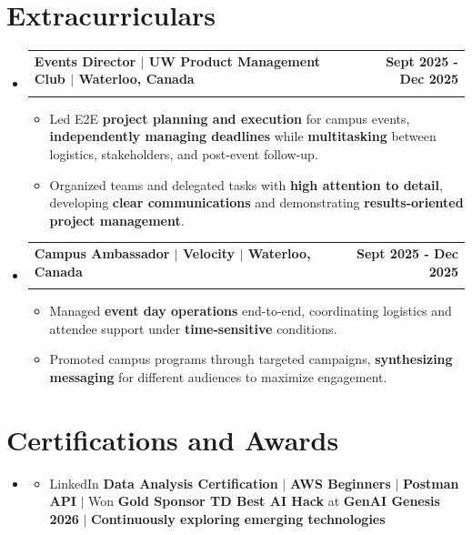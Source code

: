 \documentclass[letterpaper,10pt]{article}
\makeatletter
\newcommand{\resumeItem}[1]{
  \item\small{
    {#1 \vspace{-1pt}}
  }
}
\newcommand{\resumeSubheading}[4]{
  \vspace{-1pt}\item
    \begin{tabular*}{1.0\textwidth}[t]{l@{\extracolsep{\fill}}r}
      \textbf{#1} & \textbf{\small #2} \\
      \textit{\small#3} & \textit{\small #4} \\[-2pt]
    \end{tabular*}\vspace{-7pt}
}
\newcommand{\resumeSubHeadingListStart}{\begin{itemize}[leftmargin=0.0in, label={}]}
\newcommand{\resumeSubHeadingListEnd}{\end{itemize}}
\newcommand{\resumeItemListStart}{\begin{itemize}[leftmargin=0.15in]}
\newcommand{\resumeItemListEnd}{\end{itemize}\vspace{-4pt}}
\makeatother
\begin{document}
\section{Extracurriculars}
  \resumeSubHeadingListStart
    \resumeSubheading
      {Events Director $|$ UW Product Management Club $|$ Waterloo, Canada}{Sept 2025 - Dec 2025}
      {}{}
      \vspace{-13pt}
      \resumeItemListStart
      \vspace{-2pt}
        \resumeItem{Led E2E \textbf{project planning and execution} for campus events, \textbf{independently managing deadlines} while \textbf{multitasking} between logistics, stakeholders, and post-event follow-up.}
        \vspace{-2pt}
        \resumeItem{Organized teams and delegated tasks with \textbf{high attention to detail}, developing \textbf{clear communications} and demonstrating \textbf{results-oriented project management}.}
      \resumeItemListEnd
      \vspace{-5pt}
    \resumeSubheading
      {Campus Ambassador $|$ Velocity $|$ Waterloo, Canada}{Sept 2025 - Dec 2025}
      {}{}
      \vspace{-13pt}
      \resumeItemListStart
      \vspace{-2pt}
        \resumeItem{Managed \textbf{event day operations} end-to-end, coordinating logistics and attendee support under \textbf{time-sensitive} conditions.}
        \vspace{-2pt}
        \resumeItem{Promoted campus programs through targeted campaigns, \textbf{synthesizing messaging} for different audiences to maximize engagement.}
      \resumeItemListEnd
      \vspace{-2pt}
  \resumeSubHeadingListEnd
\vspace{-13pt}
\section{Certifications and Awards}
    \resumeSubHeadingListStart
      \item[]
          \resumeItemListStart
            \resumeItem{LinkedIn \textbf{Data Analysis Certification} $|$ \textbf{AWS Beginners} $|$ \textbf{Postman API} $|$ Won \textbf{Gold Sponsor TD Best AI Hack} at \textbf{GenAI Genesis 2026} $|$ \textbf{Continuously exploring emerging technologies}}
          \resumeItemListEnd
          \vspace{-8pt}
        
   \resumeSubHeadingListEnd
\end{document}

